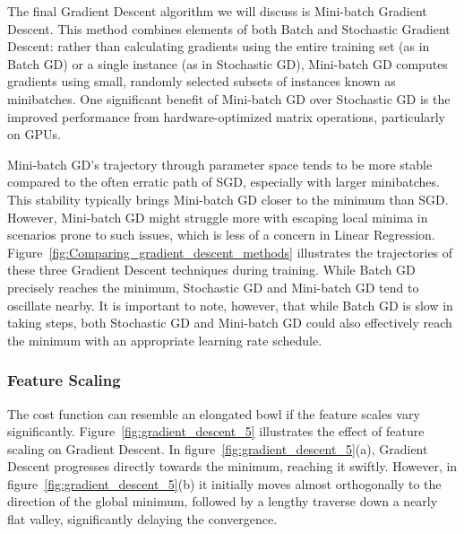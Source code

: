 \documentclass[12pt,letter]{article}
\begin{document}
The final Gradient Descent algorithm we will discuss is Mini-batch Gradient Descent. This method combines elements of both Batch and Stochastic Gradient Descent: rather than calculating gradients using the entire training set (as in Batch GD) or a single instance (as in Stochastic GD), Mini-batch GD computes gradients using small, randomly selected subsets of instances known as minibatches. One significant benefit of Mini-batch GD over Stochastic GD is the improved performance from hardware-optimized matrix operations, particularly on GPUs.

Mini-batch GD's trajectory through parameter space tends to be more stable compared to the often erratic path of SGD, especially with larger minibatches. This stability typically brings Mini-batch GD closer to the minimum than SGD. However, Mini-batch GD might struggle more with escaping local minima in scenarios prone to such issues, which is less of a concern in Linear Regression. Figure~\ref{fig:Comparing_gradient_descent_methods} illustrates the trajectories of these three Gradient Descent techniques during training. While Batch GD precisely reaches the minimum, Stochastic GD and Mini-batch GD tend to oscillate nearby. It is important to note, however, that while Batch GD is slow in taking steps, both Stochastic GD and Mini-batch GD could also effectively reach the minimum with an appropriate learning rate schedule.




\subsubsection{Feature Scaling}

The cost function can resemble an elongated bowl if the feature scales vary significantly. Figure~\ref{fig:gradient_descent_5} illustrates the effect of feature scaling on Gradient Descent. In figure~\ref{fig:gradient_descent_5}(a), Gradient Descent progresses directly towards the minimum, reaching it swiftly. However, in figure~\ref{fig:gradient_descent_5}(b) it initially moves almost orthogonally to the direction of the global minimum, followed by a lengthy traverse down a nearly flat valley, significantly delaying the convergence.
\end{document}
